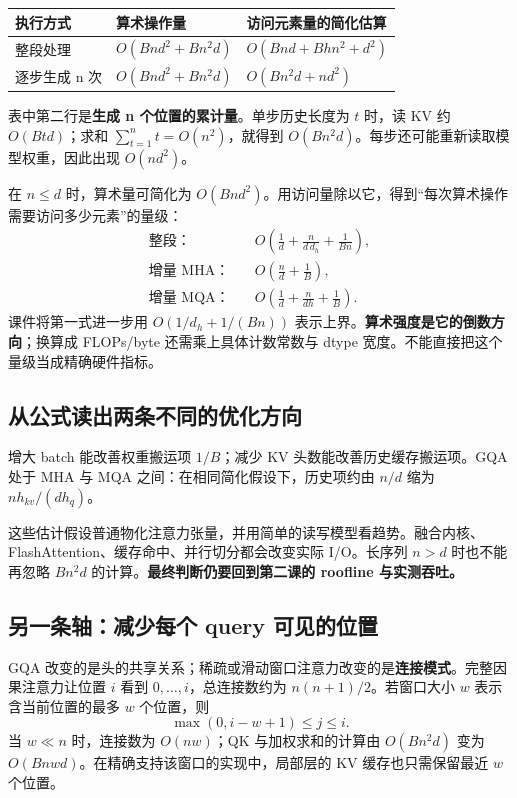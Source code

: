 \documentclass[UTF8,fontset=fandol,zihao=-4,a4paper]{ctexart}
\newcommand{\nextpage}{\clearpage}
\begin{document}
\par\noindent\begin{tabularx}{\linewidth}{@{}P{20mm}Y Y@{}}
\toprule
执行方式 & 算术操作量 & 访问元素量的简化估算\\
\midrule
整段处理 & $O(Bnd^2+Bn^2d)$ & $O(Bnd+Bhn^2+d^2)$\\
逐步生成 n 次 & $O(Bnd^2+Bn^2d)$ & $O(Bn^2d+nd^2)$\\
\bottomrule
\end{tabularx}

表中第二行是\textbf{生成 n 个位置的累计量}。单步历史长度为 $t$ 时，读 KV 约 $O(Btd)$；求和 $\sum_{t=1}^n t=O(n^2)$，就得到 $O(Bn^2d)$。每步还可能重新读取模型权重，因此出现 $O(nd^2)$。

在 $n\le d$ 时，算术量可简化为 $O(Bnd^2)$。用访问量除以它，得到“每次算术操作需要访问多少元素”的量级：
\[
\begin{aligned}
\text{整段：}\quad& O\!\left(\frac1d+\frac{n}{d\,d_h}+\frac1{Bn}\right),\\
\text{增量 MHA：}\quad& O\!\left(\frac nd+\frac1B\right),\\
\text{增量 MQA：}\quad& O\!\left(\frac1d+\frac{n}{dh}+\frac1B\right).
\end{aligned}
\]
课件将第一式进一步用 $O(1/d_h+1/(Bn))$ 表示上界。\textbf{算术强度是它的倒数方向}；换算成 FLOPs/byte 还需乘上具体计数常数与 dtype 宽度。不能直接把这个量级当成精确硬件指标。

\subsection{从公式读出两条不同的优化方向}
增大 batch 能改善权重搬运项 $1/B$；减少 KV 头数能改善历史缓存搬运项。GQA 处于 MHA 与 MQA 之间：在相同简化假设下，历史项约由 $n/d$ 缩为 $nh_{kv}/(dh_q)$。

这些估计假设普通物化注意力张量，并用简单的读写模型看趋势。融合内核、FlashAttention、缓存命中、并行切分都会改变实际 I/O。长序列 $n>d$ 时也不能再忽略 $Bn^2d$ 的计算。\textbf{最终判断仍要回到第二课的 roofline 与实测吞吐。}

\nextpage
\subsection{另一条轴：减少每个 query 可见的位置}
GQA 改变的是头的共享关系；稀疏或滑动窗口注意力改变的是\textbf{连接模式}。完整因果注意力让位置 $i$ 看到 $0,\ldots,i$，总连接数约为 $n(n+1)/2$。若窗口大小 $w$ 表示含当前位置的最多 $w$ 个位置，则
\[
\max(0,i-w+1)\le j\le i.
\]
当 $w\ll n$ 时，连接数为 $O(nw)$；QK 与加权求和的计算由 $O(Bn^2d)$ 变为 $O(Bnwd)$。在精确支持该窗口的实现中，局部层的 KV 缓存也只需保留最近 $w$ 个位置。
\end{document}
